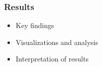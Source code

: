 \begin{frame}
    \frametitle{Results}
    \begin{itemize}
        \item Key findings
        \item Visualizations and analysis
        \item Interpretation of results
    \end{itemize}

\end{frame}